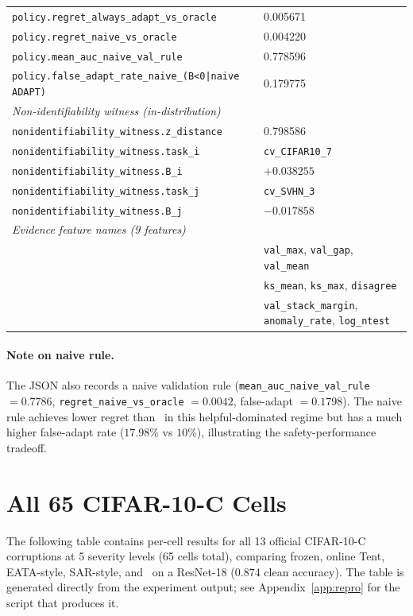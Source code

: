 \begin{table}[ht]
\begin{tabular}{ll}
\texttt{policy.regret\_always\_adapt\_vs\_oracle}  & 0.005671 \\
\texttt{policy.regret\_naive\_vs\_oracle}          & 0.004220 \\
\texttt{policy.mean\_auc\_naive\_val\_rule}        & 0.778596 \\
\texttt{policy.false\_adapt\_rate\_naive\_(B\textless{}0|naive ADAPT)} & 0.179775 \\
\midrule
\textit{Non-identifiability witness (in-distribution)} & \\
\texttt{nonidentifiability\_witness.z\_distance}   & 0.798586 \\
\texttt{nonidentifiability\_witness.task\_i}       & \texttt{cv\_CIFAR10\_7} \\
\texttt{nonidentifiability\_witness.B\_i}          & $+0.038255$ \\
\texttt{nonidentifiability\_witness.task\_j}       & \texttt{cv\_SVHN\_3} \\
\texttt{nonidentifiability\_witness.B\_j}          & $-0.017858$ \\
\midrule
\textit{Evidence feature names (9 features)} & \\
& \texttt{val\_max}, \texttt{val\_gap}, \texttt{val\_mean} \\
& \texttt{ks\_mean}, \texttt{ks\_max}, \texttt{disagree} \\
& \texttt{val\_stack\_margin}, \texttt{anomaly\_rate}, \texttt{log\_ntest} \\
\bottomrule
\end{tabular}
\end{table}

\paragraph{Note on naive rule.}  The JSON also records a naive validation rule
(\texttt{mean\_auc\_naive\_val\_rule} $= 0.7786$, \texttt{regret\_naive\_vs\_oracle}
$= 0.0042$, false-adapt $= 0.1798$).  The naive rule achieves lower regret than \KGA\
in this helpful-dominated regime but has a much higher false-adapt rate ($17.98\%$ vs
$10\%$), illustrating the safety-performance tradeoff.

\section{All 65 CIFAR-10-C Cells}
\label{sec:app-cifar10c}\label{tab:c10c}

The following table contains per-cell results for all 13 official CIFAR-10-C corruptions
at 5 severity levels (65 cells total), comparing frozen, online Tent, EATA-style,
SAR-style, and \KGA\ on a ResNet-18 ($0.874$ clean accuracy).  The table is generated
directly from the experiment output; see Appendix~\ref{app:repro} for the script that
produces it.


